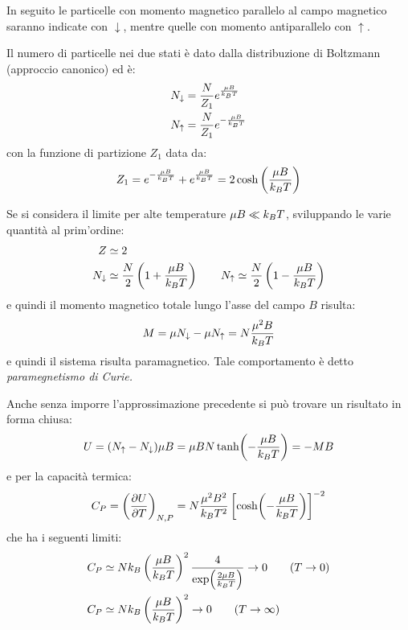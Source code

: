 In seguito le particelle con momento magnetico parallelo al campo magnetico saranno indicate con $ \downarrow $, mentre quelle con momento antiparallelo con $ \uparrow $.

Il numero di particelle nei due stati è dato dalla distribuzione di Boltzmann (approccio canonico) ed è:
\begin{align*}
N_\downarrow &= \frac{N}{Z_1} e^{\frac{\mu B}{k_B T}}\\
N_\uparrow &= \frac{N}{Z_1} e^{-\frac{\mu B}{k_B T}}
\end{align*}
con la funzione di partizione $ Z_1 $ data da:
\begin{equation*}
Z_1 = e^{-\frac{\mu B}{k_B T}} + e^{\frac{\mu B}{k_B T}} = 2 \cosh\left(\frac{\mu B}{k_B T}\right)
\end{equation*}

Se si considera il limite per alte temperature $ \mu B \ll k_B T $, sviluppando le varie quantità al prim'ordine:
\begin{align*}
Z &\simeq 2\\
N_\downarrow &\simeq \frac{N}{2} \left(1 + \frac{\mu B}{k_B T}\right) \qquad N_\uparrow \simeq \frac{N}{2} \left(1 - \frac{\mu B}{k_B T}\right)\\
\end{align*}
e quindi il momento magnetico totale lungo l'asse del campo $ B $ risulta:
\begin{equation*}
M = \mu N_\downarrow - \mu N_\uparrow = N \frac{\mu^2 B}{k_B T}
\end{equation*}
e quindi il sistema risulta paramagnetico. Tale comportamento è detto \textit{paramegnetismo di Curie.}
\newline

Anche senza imporre l'approssimazione precedente si può trovare un risultato in forma chiusa:
\begin{equation*}
U = (N_\uparrow - N_\downarrow) \mu B = \mu B N \tanh(-\frac{\mu B}{k_B T}) = -M B
\end{equation*}
e per la capacità termica:
\begin{equation*}
C_P = \left(\frac{\partial {U}}{\partial {T}}\right)_{N,P} = N \frac{\mu^2 B^2}{k_B T^2} \left[\cosh(-\frac{\mu B}{k_B T})\right]^{-2}
\end{equation*}
che ha i seguenti limiti:
\begin{align*}
C_P &\simeq N k_B \left(\frac{\mu B}{k_B T}\right)^2 \frac{4}{\exp(\frac{2\mu B}{k_B T})} \rightarrow 0 \qquad (T\rightarrow 0)\\
C_P &\simeq N k_B \left(\frac{\mu B}{k_B T}\right)^2 \rightarrow 0 \qquad (T \rightarrow \infty)
\end{align*}

